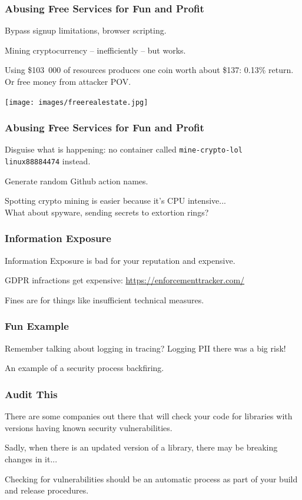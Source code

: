 \begin{frame}
\frametitle{Abusing Free Services for Fun and Profit}

Bypass signup limitations, browser scripting.

Mining cryptocurrency -- inefficiently -- but works.


Using \$103~000 of resources produces one coin worth about \$137: 0.13\% return.\\
\quad Or free money from attacker POV.

\begin{center}
	\texttt{[image: images/freerealestate.jpg]}
\end{center}

\end{frame}


\begin{frame}
\frametitle{Abusing Free Services for Fun and Profit}

Disguise what is happening: no container called \texttt{mine-crypto-lol}\\
\quad \texttt{linux88884474} instead.

Generate random Github action names.

Spotting crypto mining is easier because it's CPU intensive...\\
\quad What about spyware, sending secrets to extortion rings?


\end{frame}



\begin{frame}
\frametitle{Information Exposure}

Information Exposure is bad for your reputation and expensive.

GDPR infractions get expensive: \url{https://enforcementtracker.com/}

Fines are for things like insufficient technical measures.

\end{frame}


\begin{frame}
\frametitle{Fun Example}

Remember talking about logging in tracing? Logging PII there was a big risk!

An example of a security process backfiring.


\end{frame}



\begin{frame}
\frametitle{Audit This}

There are some companies out there that will check your code for libraries with versions having known security vulnerabilities.

Sadly, when there is an updated version of a library, there may be breaking changes in it...

Checking for vulnerabilities should be an automatic process as part of your build and release procedures. 

\end{frame}

